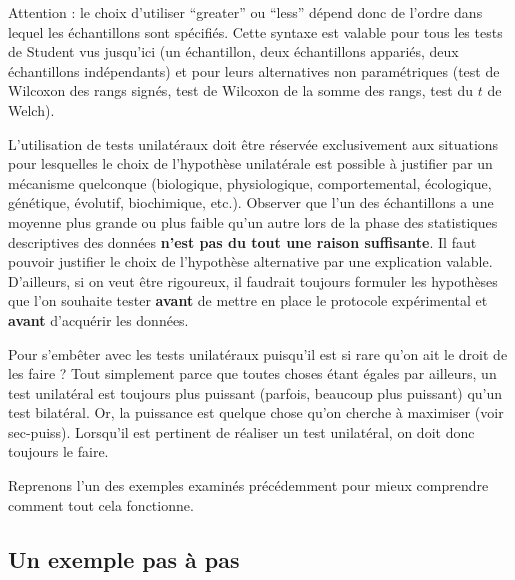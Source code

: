 \documentclass[
  a4paper,
  DIV=11,
  numbers=noendperiod,
  oneside]{scrreprt}
\begin{document}
Attention : le choix d'utiliser ``greater'' ou ``less'' dépend donc de
l'ordre dans lequel les échantillons sont spécifiés. Cette syntaxe est
valable pour tous les tests de Student vus jusqu'ici (un échantillon,
deux échantillons appariés, deux échantillons indépendants) et pour
leurs alternatives non paramétriques (test de Wilcoxon des rangs signés,
test de Wilcoxon de la somme des rangs, test du \(t\) de Welch).

\begin{tcolorbox}[enhanced jigsaw, breakable, toprule=.15mm, colbacktitle=quarto-callout-important-color!10!white, colframe=quarto-callout-important-color-frame, arc=.35mm, bottomtitle=1mm, opacityback=0, title=\textcolor{quarto-callout-important-color}{\faExclamation}\hspace{0.5em}{Attention}, bottomrule=.15mm, colback=white, toptitle=1mm, rightrule=.15mm, leftrule=.75mm, opacitybacktitle=0.6, left=2mm, titlerule=0mm, coltitle=black]

L'utilisation de tests unilatéraux doit être réservée exclusivement aux
situations pour lesquelles le choix de l'hypothèse unilatérale est
possible à justifier par un mécanisme quelconque (biologique,
physiologique, comportemental, écologique, génétique, évolutif,
biochimique, etc.). Observer que l'un des échantillons a une moyenne
plus grande ou plus faible qu'un autre lors de la phase des statistiques
descriptives des données \textbf{n'est pas du tout une raison
suffisante}. Il faut pouvoir justifier le choix de l'hypothèse
alternative par une explication valable. D'ailleurs, si on veut être
rigoureux, il faudrait toujours formuler les hypothèses que l'on
souhaite tester \textbf{avant} de mettre en place le protocole
expérimental et \textbf{avant} d'acquérir les données.

\end{tcolorbox}

Pour s'embêter avec les tests unilatéraux puisqu'il est si rare qu'on
ait le droit de les faire ? Tout simplement parce que toutes choses
étant égales par ailleurs, un test unilatéral est toujours plus puissant
(parfois, beaucoup plus puissant) qu'un test bilatéral. Or, la puissance
est quelque chose qu'on cherche à maximiser (voir sec-puiss). Lorsqu'il
est pertinent de réaliser un test unilatéral, on doit donc toujours le
faire.

Reprenons l'un des exemples examinés précédemment pour mieux comprendre
comment tout cela fonctionne.

\hypertarget{un-exemple-pas-uxe0-pas}{%
\subsection{Un exemple pas à pas}\label{un-exemple-pas-uxe0-pas}}
\end{document}
